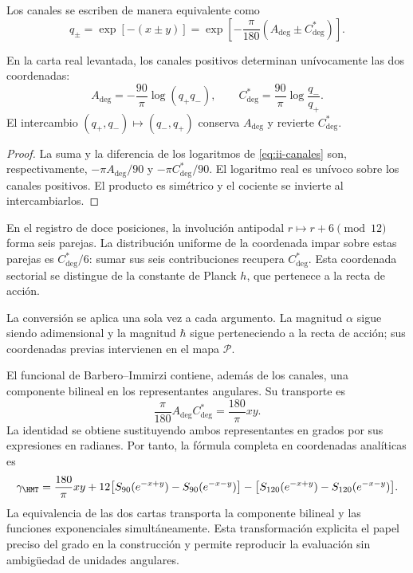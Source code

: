Los canales se escriben de manera equivalente como
\begin{equation}
 q_\pm=\exp[-(x\pm y)]
 =\exp\!\left[-\frac{\pi}{180}(A_{\deg}\pm C^*_{\deg})\right].
\label{eq:ii-canales}
\end{equation}
\begin{proposition}
\label{prop:ii-inversion-canales-angulares}
En la carta real levantada, los canales positivos determinan
unívocamente las dos coordenadas:
\[
 A_{\deg}=-\frac{90}{\pi}\log(q_+q_-),\qquad
 C^*_{\deg}=\frac{90}{\pi}\log\frac{q_-}{q_+}.
\]
El intercambio \((q_+,q_-)\mapsto(q_-,q_+)\) conserva
\(A_{\deg}\) y revierte \(C^*_{\deg}\).
\end{proposition}
\begin{proof}
La suma y la diferencia de los logaritmos de
\eqref{eq:ii-canales} son, respectivamente,
\(-\pi A_{\deg}/90\) y \(-\pi C^*_{\deg}/90\).
El logaritmo real es unívoco sobre los canales positivos.
El producto es simétrico y el cociente se invierte al intercambiarlos.
\end{proof}
En el registro de doce posiciones, la involución antipodal
\(r\mapsto r+6\pmod {12}\) forma seis parejas. La distribución
uniforme de la coordenada impar sobre estas parejas es
\(C^*_{\deg}/6\): sumar sus seis contribuciones recupera
\(C^*_{\deg}\). Esta coordenada sectorial se distingue de
la constante de Planck \(h\), que pertenece a la recta de acción.

La conversión se aplica una sola vez a cada argumento. La magnitud
\(\alpha\) sigue siendo adimensional y la magnitud \(\hbar\)
sigue perteneciendo a la recta de acción; sus coordenadas previas
intervienen en el mapa \(\mathcal P\).

El funcional de Barbero--Immirzi contiene, además de los canales, una
componente bilineal en los representantes angulares. Su transporte es
\begin{equation}
 \frac{\pi}{180}A_{\deg}C^*_{\deg}
 =\frac{180}{\pi}xy.
 \label{eq:ii-barbero-cartas}
\end{equation}
La identidad se obtiene sustituyendo ambos representantes en grados
por sus expresiones en radianes. Por tanto, la fórmula completa en
coordenadas analíticas es
\[
 \gamma_{\HMT}
 =\frac{180}{\pi}xy
 +12\bigl[S_{90}(e^{-x+y})-S_{90}(e^{-x-y})\bigr]
 -\bigl[S_{120}(e^{-x+y})-S_{120}(e^{-x-y})\bigr].
\]
La equivalencia de las dos cartas transporta la componente bilineal
y las funciones exponenciales simultáneamente. Esta transformación
explicita el papel preciso del grado en la construcción y permite
reproducir la evaluación sin ambigüedad de unidades angulares.
